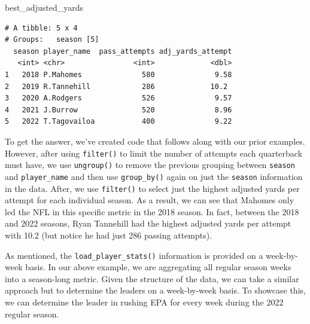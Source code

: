 \documentclass[
  letterpaper,
]{krantz}
\newenvironment{Shaded}{\begin{snugshade}}{\end{snugshade}}
\newcommand{\NormalTok}[1]{\textcolor[rgb]{0.00,0.23,0.31}{#1}}
\begin{document}
\begin{Shaded}
\begin{Highlighting}[]
\NormalTok{best\_adjusted\_yards}
\end{Highlighting}
\end{Shaded}

\begin{verbatim}
# A tibble: 5 x 4
# Groups:   season [5]
  season player_name  pass_attempts adj_yards_attempt
   <int> <chr>                <int>             <dbl>
1   2018 P.Mahomes              580              9.58
2   2019 R.Tannehill            286             10.2 
3   2020 A.Rodgers              526              9.57
4   2021 J.Burrow               520              8.96
5   2022 T.Tagovailoa           400              9.22
\end{verbatim}

To get the answer, we've created code that follows along with our prior
examples. However, after using \texttt{filter()} to limit the number of
attempts each quarterback must have, we use \texttt{ungroup()} to remove
the previous grouping between \texttt{season} and \texttt{player\_name}
and then use \texttt{group\_by()} again on just the \texttt{season}
information in the data. After, we use \texttt{filter()} to select just
the highest adjusted yards per attempt for each individual season. As a
result, we can see that Mahomes only led the NFL in this specific metric
in the 2018 season. In fact, between the 2018 and 2022 seasons, Ryan
Tannehill had the highest adjusted yards per attempt with 10.2 (but
notice he had just 286 passing attempts).

As mentioned, the \texttt{load\_player\_stats()} information is provided
on a week-by-week basis. In our above example, we are aggregating all
regular season weeks into a season-long metric. Given the structure of
the data, we can take a similar approach but to determine the leaders on
a week-by-week basis. To showcase this, we can determine the leader in
rushing EPA for every week during the 2022 regular season.
\end{document}

